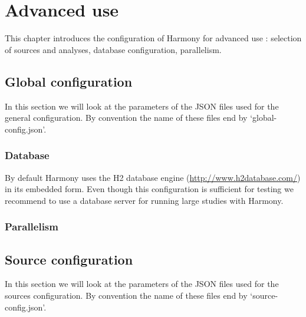 \chapter{Advanced use}

This chapter introduces the configuration of Harmony for advanced use : selection of sources and analyses, database configuration, parallelism.

	\section{Global configuration}
In this section we will look at the parameters of the JSON files used for the general configuration. By convention the name of these files end by `global-config.json'.
		\subsection{Database}
		By default Harmony uses the H2 database engine (\url{http://www.h2database.com/}) in its embedded form. Even though this configuration is sufficient for testing we recommend to use a database server for running large studies with Harmony.
		
		\subsection{Parallelism}
	
	\section{Source configuration}
In this section we will look at the parameters of the JSON files used for the sources configuration. By convention the name of these files end by `source-config.json'.
	
	